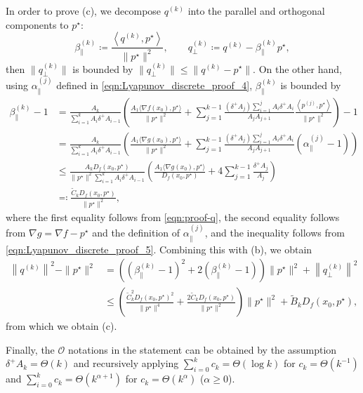 \documentclass[11pt,a4paper]{article}
\theoremstyle{definition}
\theoremstyle{plain}
\begin{document}
    In order to prove (c), we decompose $q^{(k)}$ into the parallel and orthogonal components to $p^\star$:
    \[
        \beta_\parallel^{(k)} \coloneqq \frac{\left\langle q^{(k)}, p^\star\right\rangle}{\|p^\star\|^2},\qquad q_\perp^{(k)} \coloneqq q^{(k)} - \beta_\parallel^{(k)}p^\star,
    \]
    then $\|q_\perp^{(k)}\|$ is bounded by $\|q_\perp^{(k)}\| \le \|q^{(k)} - p^\star\|$.
    On the other hand, using $\alpha_\parallel^{(j)}$ defined in \eqref{eqn:Lyapunov_discrete_proof_4}, $\beta_\parallel^{(k)}$ is bounded by
    \begin{align*}
        \beta_\parallel^{(k)} - 1
        &= \frac{A_k}{\sum_{i = 1}^kA_i\delta^+A_{i - 1}}\left(\frac{A_1\langle\nabla f(x_0), p^\star\rangle}{\|p^\star\|^2} + \sum_{j = 1}^{k - 1}\frac{(\delta^+A_j)\sum_{i = 1}^jA_i\delta^+A_i}{A_jA_{j + 1}}\frac{\left\langle p^{(j)}, p^\star\right\rangle}{\|p^\star\|^2}\right) - 1\\
        &= \frac{A_k}{\sum_{i = 1}^kA_i\delta^+A_{i - 1}}\left(\frac{A_1\langle\nabla g(x_0), p^\star\rangle}{\|p^\star\|^2} + \sum_{j = 1}^{k - 1}\frac{(\delta^+A_j)\sum_{i = 1}^jA_i\delta^+A_i}{A_jA_{j + 1}}\left(\alpha_\parallel^{(j)} - 1\right)\right)\\
        &\le \frac{A_kD_f(x_0, p^\star)}{\|p^\star\|^2\sum_{i = 1}^kA_i\delta^+A_{i - 1}}\left(\frac{A_1\langle\nabla g(x_0), p^\star\rangle}{D_f(x_0, p^\star)} + 4\sum_{j = 1}^{k - 1}\frac{\delta^+A_j}{A_j}\right)\\
        &\eqqcolon \frac{\tilde C_kD_f(x_0, p^\star)}{\|p^\star\|^2},
    \end{align*}
    where the first equality follows from \eqref{eqn:proof-q}, the second equality follows from $\nabla g = \nabla f - p^\star$ and the definition of $\alpha_\parallel^{(j)}$, and the inequality follows from \eqref{eqn:Lyapunov_discrete_proof_5}.
    Combining this with (b), we obtain
    \begin{align*}
        \left\|q^{(k)}\right\|^2 - \|p^\star\|^2
        &= \left(\left(\beta_\parallel^{(k)} - 1\right)^2 + 2\left(\beta_\parallel^{(k)} - 1\right)\right)\|p^\star\|^2 + \left\|q_\perp^{(k)}\right\|^2\\
        &\le \left(\frac{\tilde C_k^2D_f(x_0, p^\star)^2}{\|p^\star\|^4} + \frac{2\tilde C_kD_f(x_0, p^\star)}{\|p^\star\|^2}\right)\|p^\star\|^2 + \tilde B_kD_f(x_0, p^\star),
    \end{align*}
    from which we obtain (c).

    Finally, the $\mathcal{O}$ notations in the statement can be obtained by the assumption $\delta^+A_k = \Theta(k)$ and recursively applying $\sum_{i = 0}^kc_k = \Theta(\log k)$ for $c_k = \Theta(k^{-1})$ and $\sum_{i = 0}^kc_k = \Theta(k^{\alpha + 1})$ for $c_k = \Theta(k^\alpha)$ ($\alpha \ge 0$).
\end{document}
